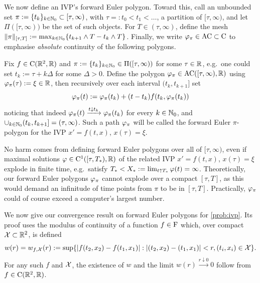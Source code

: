 We now define an IVP's forward Euler polygon. Toward this, call an unbounded set $\pi:=\{t_k\}_{k\in\mathbb{N}_0}\subset[\tau,\infty)$, with $\tau=:t_0<t_1<\dots$, a partition of $[\tau,\infty)$, and let $\Pi([\tau,\infty))$ be the set of such objects. For $T\in(\tau,\infty)$, define the mesh $\Vert\pi\Vert_{[\tau,T]}:=\max_{k\in\mathbb{N}_0}\{t_{k+1}\wedge T - t_k\wedge T\}$. Finally, we write $\varphi_\pi\in\mathrm{AC}\subset\mathrm{C}$ to emphasise \emph{absolute} continuity of the following polygons.

\begin{definition}\label{alg:forward_euler}
    Fix $f\in\mathrm{C}(\mathbb{R}^2,\mathbb{R})$ and $\pi:=\{t_k\}_{k\in\mathbb{N}_0}\in\Pi([\tau,\infty))$ for some $\tau\in\mathbb{R}$, e.g.~one could set $t_k:=\tau+k\Delta$ for some $\Delta>0$. Define the polygon $\varphi_\pi\in\mathrm{AC}([\tau,\infty),\mathbb{R})$ using $\varphi_\pi(\tau):=\xi\in\mathbb{R}$, then recursively over each interval $(t_k,t_{k+1}]$ set
    \begin{equation}\label{alg:equation}
        \varphi_\pi(t) := \varphi_\pi(t_k) + (t-t_k) f(t_k,\varphi_\pi(t_k))
    \end{equation}
    noticing that indeed $\varphi_\pi(t)\xrightarrow{t\downarrow t_k}\varphi_\pi(t_k)$ for every $k\in\mathbb{N}_0$, and $\cup_{k\in\mathbb{N}_0}(t_k,t_{k+1}]=(\tau,\infty)$. Such a path $\varphi_\pi$ will be called the forward Euler $\pi$-polygon for the IVP $x'=f(t,x)$, $x(\tau)=\xi$.
\end{definition}

No harm comes from defining forward Euler polygons over all of $[\tau,\infty)$, even if maximal solutions $\varphi\in\mathrm{C}^1([\tau,T_*),\mathbb{R})$ of the related IVP $x'=f(t,x)$, $x(\tau)=\xi$ explode in finite time, e.g.~satisfy $T_*<X_*:=\lim_{t\uparrow T_*}\varphi(t)=\infty$. Theoretically, our forward Euler polygons $\varphi_\pi$ cannot explode over a compact $[\tau,T]$, as this would demand an infinitude of time points from $\pi$ to be in $[\tau,T]$. Practically, $\varphi_\pi$ could of course exceed a computer's largest number.

We now give our convergence result on forward Euler polygons for \autoref{prob:ivp}. Its proof uses the modulus of continuity of a function $f\in\mathrm{F}$ which, over compact $\mathcal{X}\subset\mathbb{R}^2$, is defined
\begin{equation}\label{eq:mod_cont_def}
    w(r) = w_{f,\mathcal{X}}(r) := \sup\{|f(t_2,x_2)-f(t_1,x_1)|:|(t_2,x_2)-(t_1,x_1)|<r,(t_i,x_i)\in\mathcal{X}\}.
\end{equation}
For any such $f$ and $\mathcal{X}$, the existence of $w$ and the limit $w(r)\xrightarrow{r\downarrow0}0$ follow from $f\in\mathrm{C}(\mathbb{R}^2,\mathbb{R})$.

